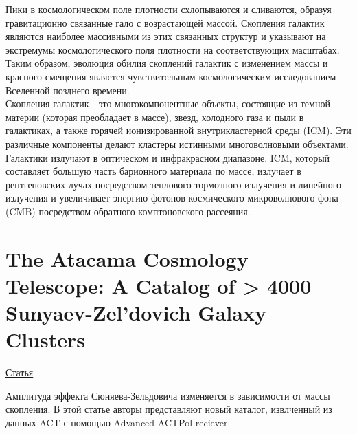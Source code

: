 \documentclass{article}
\begin{document}
Пики в космологическом поле плотности схлопываются и сливаются, образуя гравитационно связанные 
гало с возрастающей массой. Скопления галактик являются наиболее массивными из этих связанных 
структур и указывают на экстремумы космологического поля плотности на соответствующих масштабах.
Таким образом, эволюция обилия скоплений галактик с изменением массы и красного смещения является
чувствительным космологическим исследованием Вселенной позднего времени.\\

Скопления галактик - это многокомпонентные объекты, состоящие из темной материи (которая 
преобладает в массе), звезд, холодного газа и пыли в галактиках, а также горячей ионизированной
внутрикластерной среды (ICM). Эти различные компоненты делают кластеры истинными многоволновыми 
объектами. Галактики излучают в оптическом и инфракрасном диапазоне. ICM, который составляет 
большую часть барионного материала по массе, излучает в рентгеновских лучах посредством теплового
тормозного излучения и линейного излучения и увеличивает энергию фотонов космического микроволнового 
фона (CMB) посредством обратного комптоновского рассеяния.\\

\section{The Atacama Cosmology Telescope: A Catalog of > 4000 Sunyaev-Zel’dovich Galaxy Clusters}
\hyperlink{https://arxiv.org/pdf/2009.11043.pdf}{Статья}

Амплитуда эффекта Сюняева-Зельдовича изменяется в зависимости от массы скопления. В этой статье 
авторы представляют новый каталог, извлченный из данных ACT с помощью Advanced ACTPol reciever.\\

\end{document}
